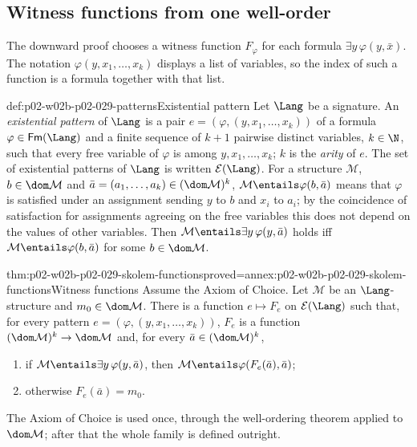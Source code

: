 \subsection{Witness functions from one well-order}
\label{sec:p02-w02b-p02-029-witnesses}

The downward proof chooses a witness function \(F_\varphi\) for each formula
\(\exists y\,\varphi(y,\bar x)\). The notation \(\varphi(y,x_1,\ldots,x_k)\)
displays a list of variables, so the index of such a function is a formula
together with that list.

\begin{hbdefinition}{def:p02-w02b-p02-029-patterns}{Existential pattern}
Let \(\Lang\) be a signature. An \emph{existential pattern} of \(\Lang\) is
a pair \(e=(\varphi,(y,x_1,\ldots,x_k))\) of a formula
\(\varphi\in\mathsf{Fm}(\Lang)\) and a finite sequence of
\(k+1\) pairwise distinct variables, \(k\in\N\), such that every free
variable of \(\varphi\) is among \(y,x_1,\ldots,x_k\); \(k\) is the
\emph{arity} of \(e\). The set of existential patterns of \(\Lang\) is
written \(\mathcal E(\Lang)\). For a structure \(\mathcal M\),
\(b\in\dom\mathcal M\) and \(\bar a=(a_1,\ldots,a_k)\in(\dom\mathcal M)^k\),
\(\mathcal M\entails\varphi(b,\bar a)\) means that \(\varphi\) is satisfied
under an assignment sending \(y\) to \(b\) and \(x_i\) to \(a_i\); by the
coincidence of satisfaction for assignments agreeing on the free variables
this does not depend on the values of other variables. Then
\(\mathcal M\entails\exists y\,\varphi(y,\bar a)\) holds iff
\(\mathcal M\entails\varphi(b,\bar a)\) for some \(b\in\dom\mathcal M\).
\end{hbdefinition}

\begin{hblemma}{thm:p02-w02b-p02-029-skolem-functions}{proved=annex:p02-w02b-p02-029-skolem-functions}{Witness functions}
Assume the Axiom of Choice. Let \(\mathcal M\) be an \(\Lang\)-structure and
\(m_0\in\dom\mathcal M\). There is a function \(e\mapsto F_e\) on
\(\mathcal E(\Lang)\) such that, for every pattern
\(e=(\varphi,(y,x_1,\ldots,x_k))\), \(F_e\) is a function
\((\dom\mathcal M)^k\to\dom\mathcal M\) and, for every
\(\bar a\in(\dom\mathcal M)^k\),
\begin{enumerate}
  \item if \(\mathcal M\entails\exists y\,\varphi(y,\bar a)\), then
        \(\mathcal M\entails\varphi(F_e(\bar a),\bar a)\);
  \item otherwise \(F_e(\bar a)=m_0\).
\end{enumerate}
The Axiom of Choice is used once, through the well-ordering theorem applied
to \(\dom\mathcal M\); after that the whole family is defined outright.
\end{hblemma}

